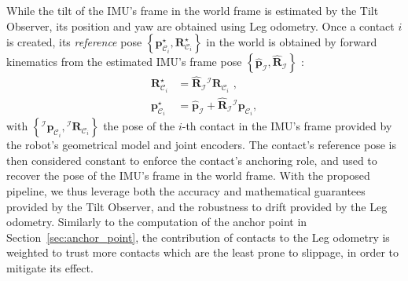 \documentclass{IJCAS}
\begin{document}
While the tilt of the IMU's frame in the world frame is estimated by the Tilt Observer, its position and yaw are obtained using Leg odometry. Once a contact $i$ is created, its \emph{reference} pose $\left\{ \boldsymbol{p}^{\star}_{\mathcal{C}_{i}}, \boldsymbol{R}^{\star}_{\mathcal{C}_{i}}\right\}$ in the world is obtained by forward kinematics from the estimated IMU's frame pose $\left\{ \hat{\boldsymbol{p}}_{\mathcal{I}}, \hat{\boldsymbol{R}}_{\mathcal{I}}\right\}$ :
\begin{align}
  \boldsymbol{R}^{\star}_{\mathcal{C}_{i}}  & = \hat{\boldsymbol{R}}_{\mathcal{I}}  {}^{\mathcal{I}} \boldsymbol{R}_{\mathcal{C}_{i}}  \text{ ,}\\
    \boldsymbol{p}^{\star}_{{\mathcal{C}}_{i}}   & = \hat{\boldsymbol{p}}_{\mathcal{I}} + \hat{\boldsymbol{R}}_{\mathcal{I}} {}^{\mathcal{I}}\boldsymbol{p}_{{\mathcal{C}}_{i}} ,
\end{align}
with $\left\{ {}^{\mathcal{I}}\boldsymbol{p}_{{\mathcal{C}}_{i}}, {}^{\mathcal{I}} \boldsymbol{R}_{\mathcal{C}_{i}} \right\}$ the pose of the $i$-th contact in the IMU's frame provided by the robot's geometrical model and joint encoders.
The contact's reference pose is then considered constant to enforce the contact's anchoring role, and used to recover the pose of the IMU's frame in the world frame. 
With the proposed pipeline, we thus leverage both the accuracy and mathematical guarantees provided by the Tilt Observer, and the robustness to drift provided by the Leg odometry. Similarly to the computation of the anchor point in Section~\ref{sec:anchor_point}, the contribution of contacts to the Leg odometry is weighted to trust more contacts which are the least prone to slippage, in order to mitigate its effect.
\end{document}
